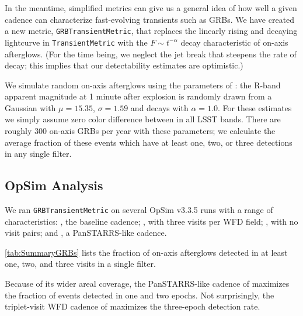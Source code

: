 In the meantime, simplified metrics can give us a general idea of how well
a given cadence can characterize fast-evolving transients such as GRBs.  We
have created a new metric, \texttt{GRBTransientMetric}, that replaces the
linearly rising and decaying lightcurve in \texttt{TransientMetric} with
the $F \sim t^{-\alpha}$ decay characteristic of on-axis afterglows.  (For
the time being, we neglect the jet break that steepens the rate of decay;
this implies that our detectability estimates are optimistic.)

We simulate random on-axis afterglows using the parameters of
\citet{2011PASP..123.1034J}: the R-band apparent magnitude at 1 minute
after explosion is randomly drawn from a Gaussian with $\mu=15.35$,
$\sigma=1.59$ and decays with $\alpha=1.0$.  For these estimates we
simply assume zero color difference between in all LSST bands.
There are roughly 300 on-axis GRBs per year with these parameters;
we calculate the average fraction of these events which have at least one,
two, or three detections in any single filter.



\subsection{OpSim Analysis}
\label{sec:\secname:analysis}

We ran \texttt{GRBTransientMetric} on several OpSim v3.3.5 runs with a range of
characteristics:  , the baseline cadence;
, with three visits per WFD field;
, with no visit pairs; and
, a PanSTARRS-like cadence.

\autoref{tab:SummaryGRBs} lists the fraction of on-axis afterglows
detected in at least one, two, and three visits in a single filter.

Because of its wider areal coverage, the PanSTARRS-like cadence of
 maximizes the fraction of events detected in
one and two epochs.  Not surprisingly, the triplet-visit WFD cadence of
 maximizes the three-epoch detection
rate.


